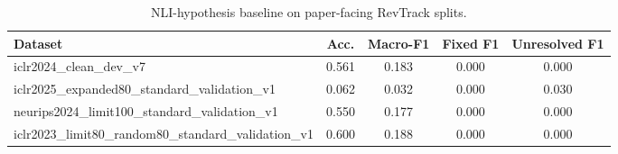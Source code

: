 \begin{table}[t]
\centering
\small
\begin{tabular}{lcccc}
\toprule
Dataset & Acc. & Macro-F1 & Fixed F1 & Unresolved F1 \\
\midrule
iclr2024\_clean\_dev\_v7 & 0.561 & 0.183 & 0.000 & 0.000 \\
iclr2025\_expanded80\_standard\_validation\_v1 & 0.062 & 0.032 & 0.000 & 0.030 \\
neurips2024\_limit100\_standard\_validation\_v1 & 0.550 & 0.177 & 0.000 & 0.000 \\
iclr2023\_limit80\_random80\_standard\_validation\_v1 & 0.600 & 0.188 & 0.000 & 0.000 \\
\bottomrule
\end{tabular}
\caption{NLI-hypothesis baseline on paper-facing RevTrack splits.}
\label{tab:nli-hypothesis-transfer}
\end{table}
